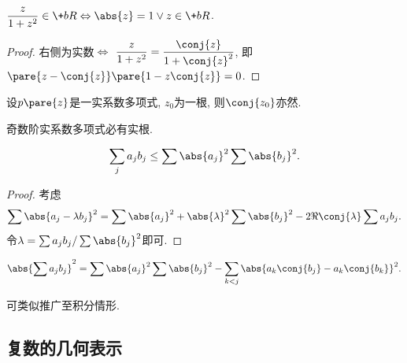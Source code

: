 \documentclass{ctexart}
\begin{document}
\begin{sample}
    \begin{ex}
        $\displaystyle \frac{z}{1+z^2} \in\+bR \Leftrightarrow \abs{z} = 1 \lor z\in\+bR$.\hfill{}
    \end{ex}
    \begin{proof}
        右侧为实数$\Leftrightarrow$
        $\displaystyle\frac{z}{1+z^2} = \frac{\conj{z}}{1+\conj{z}^2}$, 即$\pare{z-\conj{z}}\pare{1-z\conj{z}} = 0$.
    \end{proof}
\end{sample}
\begin{sample}
    \begin{ex}
        设$p\pare{z}$是一实系数多项式, $z_0$为一根, 则$\conj{z_0}$亦然.
    \end{ex}
    \begin{corollary}
        奇数阶实系数多项式必有实根.
    \end{corollary}
\end{sample}
\begin{sample}
    \begin{ex}[Cauchy不等式]
        \[ \sum_j a_jb_j \le \sum\abs{a_j}^2\sum \abs{b_j}^2. \]
    \end{ex}
    \begin{proof}
        考虑  
        \[ \sum \abs{a_j - \lambda b_j}^2 = \sum \abs{a_j}^2 + \abs{\lambda}^2 \sum \abs{b_j}^2 - 2\Re\conj{\lambda}\sum a_jb_j. \]
        令$\lambda = \sum a_jb_j/\sum \abs{b_j}^2$即可.
    \end{proof}
    \begin{remark}[Lagrange恒等式]
        \[ \abs{\sum a_jb_j}^2 = \sum\abs{a_j}^2\sum\abs{b_j}^2 - \sum_{k<j}\abs{a_k\conj{b_j} - a_k\conj{b_k}}^2. \]
    \end{remark}
    \begin{remark}
        可类似推广至积分情形.
    \end{remark}
\end{sample}


\subsection{复数的几何表示} %
\label{sub:复数的几何表示}
\end{document}
